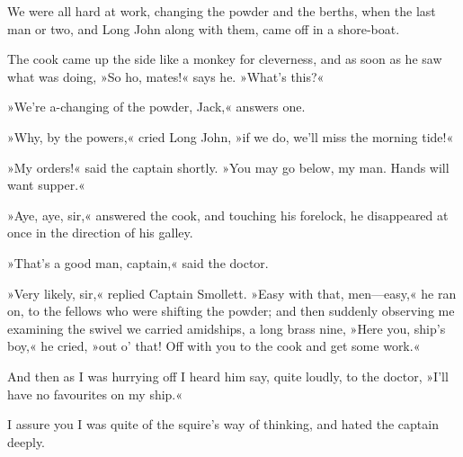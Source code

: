 We were all hard at work, changing the powder and the berths, when the last man or two, and Long John along with them, came off in a shore-boat.

The cook came up the side like a monkey for cleverness, and as soon as he saw what was doing, »So ho, mates!« says he. »What's this?«

»We're a-changing of the powder, Jack,« answers one.

»Why, by the powers,« cried Long John, »if we do, we'll miss the morning tide!«

»My orders!« said the captain shortly. »You may go below, my man. Hands will want supper.«

»Aye, aye, sir,« answered the cook, and touching his forelock, he disappeared at once in the direction of his galley.

»That's a good man, captain,« said the doctor.

»Very likely, sir,« replied Captain Smollett. »Easy with that, men—easy,« he ran on, to the fellows who were shifting the powder; and then suddenly observing me examining the swivel we carried amidships, a long brass nine, »Here you, ship's boy,« he cried, »out o' that! Off with you to the cook and get some work.«


And then as I was hurrying off I heard him say, quite loudly, to the doctor, »I'll have no favourites on my ship.«

I assure you I was quite of the squire's way of thinking, and hated the captain deeply.
